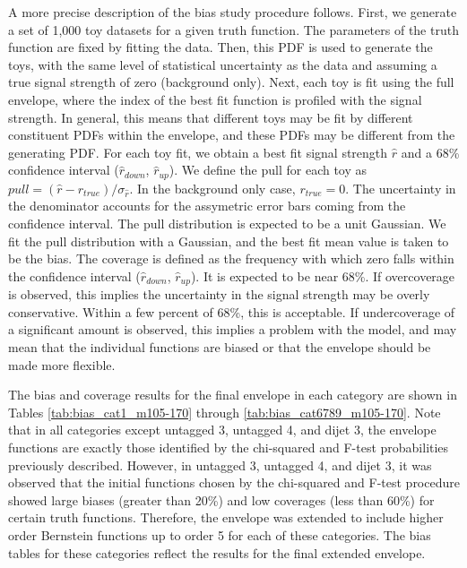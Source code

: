 A more precise description of the bias study procedure follows. First, we generate 
a set of 1,000 toy datasets for a given truth function. The parameters of the truth 
function are fixed by fitting the data. Then, this PDF is used to generate the toys, 
with the same level of statistical uncertainty as the data
and assuming a true signal strength of zero (background only). Next, each toy is fit using 
the full envelope, where the index of the best fit function is profiled with the 
signal strength. In general, this means that different toys may be fit by different 
constituent PDFs within the envelope, and these PDFs may be different from the generating PDF. 
For each toy fit, we obtain a best fit signal strength $\hat{r}$ and a 68\% confidence interval
($\hat{r}_{down}$, $\hat{r}_{up}$). We define the pull for each toy as 
$pull = (\hat{r}-r_{true})/\sigma_{\hat{r}}$. In the background only case, $r_{true} = 0$. 
The uncertainty in the denominator accounts for
the assymetric error bars coming from the confidence interval. The pull distribution is expected
to be a unit Gaussian. We fit the pull distribution with a Gaussian, and the best fit mean 
value is taken to be the bias. The coverage is defined as the frequency with which zero falls
within the confidence interval ($\hat{r}_{down}$, $\hat{r}_{up}$). It is expected to be 
near 68\%. If overcoverage is observed, this implies the uncertainty in the signal strength may 
be overly conservative. Within a few percent of 68\%, this is acceptable. If undercoverage of 
a significant amount is observed, this implies a problem with the model, and may mean that 
the individual functions are biased or that the envelope should be made more flexible. 

The bias and coverage results for the final envelope in each category 
are shown in Tables \ref{tab:bias_cat1_m105-170} through \ref{tab:bias_cat6789_m105-170}. 
Note that in all categories except untagged 3, untagged 4, and dijet 3, the envelope functions 
are exactly those identified by the chi-squared and F-test probabilities previously described.
However, in untagged 3, untagged 4, and dijet 3, it was observed that the initial functions chosen 
by the chi-squared and F-test procedure showed large biases (greater than 20\%) and low coverages (less than 60\%) for 
certain truth functions. Therefore, the envelope was extended to include higher order Bernstein functions up 
to order 5 for each of these categories. The bias tables for these categories reflect the results for the final 
extended envelope. 

